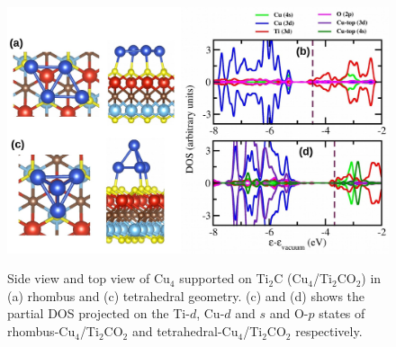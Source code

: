 \begin{figure}[ht]
 \begin{center}
    \includegraphics[width=12cm]{./Appendix2/Appendix2_figures/cu_ti2co2.jpg} \\[0cm]
 \end{center}
 \caption{Side view and top view of Cu$_4$ supported on Ti$_2$C (Cu$_4$/Ti$_2$CO$_2$) in (a) rhombus and (c) tetrahedral geometry. (c) and (d) shows the partial DOS projected on the
 Ti-$d$, Cu-$d$ and $s$ and O-$p$ states of rhombus-Cu$_4$/Ti$_2$CO$_2$ and tetrahedral-Cu$_4$/Ti$_2$CO$_2$
 respectively.}
  \label{cu_ti2co2}
\end{figure}


